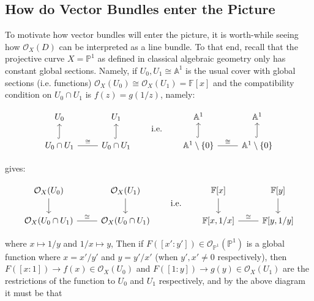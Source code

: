 \documentclass{book}
\newcommand{\A}{{\mathbb{A}}}
\newcommand{\F}{{\mathbb{F}}}
\renewcommand{\P}{{\mathbb{P}}}
\newcommand{\CO}{{\mathcal{O}}}
\begin{document}
\subsection{How do Vector Bundles enter the Picture}\label{sec:whyVecBundles}

To motivate how vector bundles will enter the picture, it is worth-while seeing how $\CO_X(D)$ can be
interpreted as a line bundle. To that end, recall that the projective curve $X = \P^1$ as defined in classical
algebraic geometry only has constant global sections. Namely, if $U_0, U_1\cong \A^1$ is the usual cover with
global sections (i.e. functions) $\CO_X(U_0) \cong \CO_X(U_1) = \F[x]$ and the compatibility condition on
$U_0\cap U_1$ is $f(z) = g(1/z)$, namely:
\begin{center}
  \[
\begin{tikzcd}
U_0                                               &               U_1 \\
     U_0\cap U_1 \arrow[r, "\cong", no head] \arrow[u, hook] & U_0\cap U_1 \arrow[u, hook]
\end{tikzcd}
\qquad \text{i.e.} \qquad
\begin{tikzcd}
\A^1                                       &              \A^1 \\
     \A^1\setminus\{0\} \arrow[u, hook] \arrow[r, "\cong", no head] & \A^1\setminus\{0\} \arrow[u, hook]
\end{tikzcd}
\]
\end{center}
gives:
\begin{center}
  \[
\begin{tikzcd}
\CO_X(U_0) \arrow[d]                                &              \CO_X(U_1) \arrow[d] \\
                    \CO_X(U_0\cap U_1) \arrow[r, "\cong", no head] & \CO_X(U_0\cap U_1)
\end{tikzcd}
\qquad \text{i.e.} \qquad
\begin{tikzcd}
{\F[x]} \arrow[d]                        & {\F[y]} \arrow[d] \\
{\F[x, 1/x]} \arrow[r, "\cong", no head] & {\F[y, 1/y]}
\end{tikzcd}
\]
\end{center}
where $x \mapsto 1/y$ and $1/x \mapsto y$, Then if $F([x':y']) \in
\CO_{\P^1}(\P^1)$ is a global function where $x = x'/y'$ and $y  =y'/x'$ (when $y',x'\ne 0$ respectively), then $F([x:1]) \to f(x) \in \CO_X(U_0)$ and $F([1:y]) \to g(y) \in \CO_X(U_1)$
are the restrictions of the function to $U_0$ and $U_1$ respectively, and by the above diagram it must be that
\end{document}
